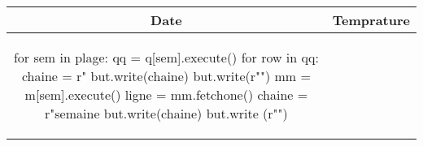 \documentclass[12pt]{article}
\begin{document}
\begin{supertabular}{cc}
\hline
Date & Temprature \\
\hline
\begin{lbdpython}
for sem in plage:
qq = q[sem].execute()
for row in qq:
chaine = r"%
but.write(chaine)
but.write(r"\hline")
mm = m[sem].execute()
ligne = mm.fetchone()
chaine = r"semaine %
but.write(chaine)
but.write (r"\hline")
\end{lbdpython}
\end{supertabular}
\end{document}
